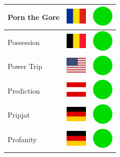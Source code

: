 \documentclass[12pt, a4paper, twoside]{report}
\begin{document}
\begin{center}
\begin{longtable}{|p{5cm}|p{2cm}|p{2cm}|}
Porn the Gore & \includegraphics[width=1cm]{4x3/ro} & \includegraphics[width=1cm]{likes/y} \\ \hline
Possession & \includegraphics[width=1cm]{4x3/be} & \includegraphics[width=1cm]{likes/y} \\ \hline
Power Trip & \includegraphics[width=1cm]{4x3/us} & \includegraphics[width=1cm]{likes/y} \\ \hline
Prediction & \includegraphics[width=1cm]{4x3/at} & \includegraphics[width=1cm]{likes/y} \\ \hline
Pripjat & \includegraphics[width=1cm]{4x3/de} & \includegraphics[width=1cm]{likes/y} \\ \hline
Profanity & \includegraphics[width=1cm]{4x3/de} & \includegraphics[width=1cm]{likes/y} \\ \hline

\end{longtable}
\end{center}
\end{document}
